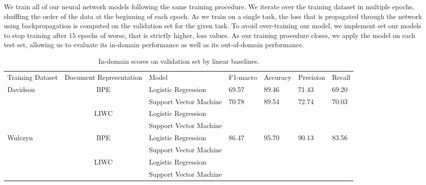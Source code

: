 We train all of our neural network models following the same training procedure. We iterate over the training dataset in multiple epochs, shuffling the order of the data at the beginning of each epoch. As we train on a single task, the loss that is propagated through the network using backpropagation is computed on the validation set for the given task. To avoid over-training our model, we implement set our models to stop training after $15$ epochs of worse, that is strictly higher, loss values. As our training procedure closes, we apply the model on each test set, allowing us to evaluate its in-domain performance as well as its out-of-domain performance.

\begin{landscape}
\begin{table}[]
\centering
\begin{tabular}{lclllll}
Training Dataset          & \multicolumn{1}{l}{Document Representation} & Model                   & F1-macro & Accuracy & Precision & Recall \\
\multirow{4}{*}{Davidson} & \multirow{2}{*}{BPE}                        & Logistic Regression     & 69.57    & 89.46    & 71.43     & 69.20  \\
                          &                                             & Support Vector Machine  & 70.78    & 89.54    & 72.74     & 70.03  \\
                          & \multirow{2}{*}{LIWC}                       & Logistic Regression     &          &          &           &        \\
                          &                                             & Support Vector Machine  &          &          &           &        \\
\multirow{4}{*}{Wulczyn}  & \multirow{2}{*}{BPE}                        & Logistic Regression     & 86.47    & 95.70    & 90.13     & 83.56  \\
                          &                                             & Support Vector Machine  &          &          &           &        \\
                          & \multirow{2}{*}{LIWC}                       & Logistic Regression     &          &          &           &        \\
                          &                                             & Support Vector Machine  &          &          &           &
\end{tabular}%
\caption{In-domain scores on validation set by linear baselines.}
\label{tab:redux_linear_baselines_dev}
\end{table}
\end{landscape}

